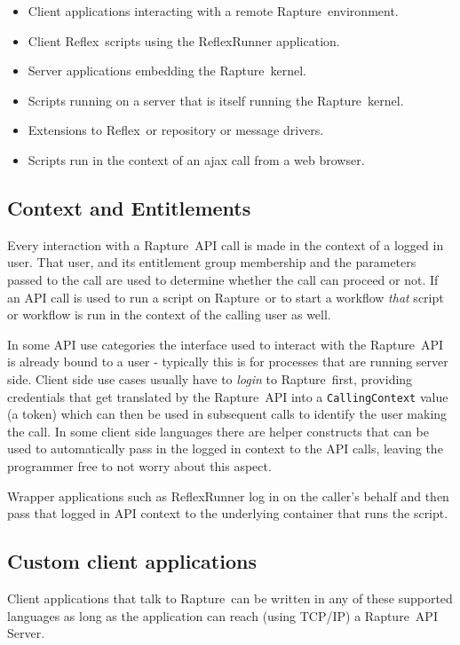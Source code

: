 \documentclass[12pt,twoside,a4paper]{article}
\newcommand{\Rapture}{Rapture~}
\newcommand{\Reflex}{Reflex~}
\begin{document}
\begin{itemize}
  \item{Client applications interacting with a remote \Rapture environment.}
  \item{Client \Reflex scripts using the ReflexRunner application.}
  \item{Server applications embedding the \Rapture kernel.}
  \item{Scripts running on a server that is itself running the \Rapture kernel.}
  \item{Extensions to \Reflex or repository or message drivers.}
  \item{Scripts run in the context of an ajax call from a web browser.}
\end{itemize}

\subsection{Context and Entitlements}
Every interaction with a \Rapture API call is made in the context of a logged in
user. That user, and its entitlement group membership and the parameters passed
to the call are used to determine whether the call can proceed or not. If an
API call is used to run a script on \Rapture or to start a workflow \emph{that} script
or workflow is run in the context of the calling user as well.

In some API use categories the interface used to interact with the \Rapture API
is already bound to a user - typically this is for processes that are running
server side. Client side use cases usually have to \emph{login} to \Rapture first,
providing credentials that get translated by the \Rapture API into a \verb+CallingContext+
value (a token) which can then be used in subsequent calls to identify the user
making the call. In some client side languages there are helper constructs that
can be used to automatically pass in the logged in context to the API calls,
leaving the programmer free to not worry about this aspect.

Wrapper applications such as ReflexRunner log in on the caller's behalf and then
pass that logged in API context to the underlying container that runs the script.

\subsection{Custom client applications}

Client applications that talk to \Rapture can be written in any of these supported languages as
long as the application can reach (using TCP/IP) a \Rapture API Server.
\end{document}
